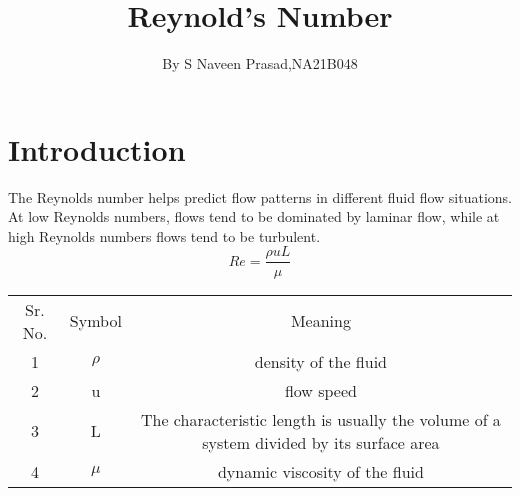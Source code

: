 \documentclass{article}
\begin{document}
\title{Reynold's Number}
\author{By S Naveen Prasad,NA21B048}

\maketitle

\section{Introduction}
The Reynolds number helps predict flow patterns in different fluid flow situations. At low Reynolds numbers, flows tend to be dominated by laminar flow, while at high Reynolds numbers flows tend to be turbulent.
\begin{equation}
    \label{simple_equation}
    Re = \frac{\rho u L}{\mu}
\end{equation}
\begin{table}
\centering
\begin{tabular}{|c|c|c|}
Sr. No. & Symbol & Meaning \\
1 & $\rho$ & density of the fluid \\
2 &  u   & flow speed \\
3 &  L   & The characteristic length is usually the volume of a system divided by its surface area \\
4 & $\mu$ & dynamic viscosity of the fluid \\
\end{tabular}
\end{table}
\end{document}
